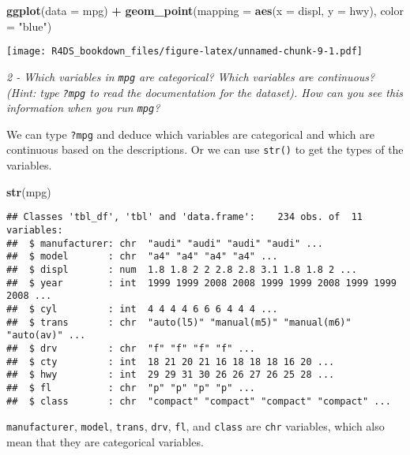 \documentclass[]{article}
\newenvironment{Shaded}{\begin{snugshade}}{\end{snugshade}}
\newcommand{\KeywordTok}[1]{\textcolor[rgb]{0.13,0.29,0.53}{\textbf{#1}}}
\newcommand{\DataTypeTok}[1]{\textcolor[rgb]{0.13,0.29,0.53}{#1}}
\newcommand{\StringTok}[1]{\textcolor[rgb]{0.31,0.60,0.02}{#1}}
\newcommand{\OperatorTok}[1]{\textcolor[rgb]{0.81,0.36,0.00}{\textbf{#1}}}
\newcommand{\NormalTok}[1]{#1}
\theoremstyle{definition}
\theoremstyle{definition}
\theoremstyle{definition}
\theoremstyle{remark}
\begin{document}
\begin{Shaded}
\begin{Highlighting}[]
\KeywordTok{ggplot}\NormalTok{(}\DataTypeTok{data =}\NormalTok{ mpg) }\OperatorTok{+}\StringTok{ }
\StringTok{  }\KeywordTok{geom_point}\NormalTok{(}\DataTypeTok{mapping =} \KeywordTok{aes}\NormalTok{(}\DataTypeTok{x =}\NormalTok{ displ, }\DataTypeTok{y =}\NormalTok{ hwy), }\DataTypeTok{color =} \StringTok{"blue"}\NormalTok{)}
\end{Highlighting}
\end{Shaded}

\texttt{[image: R4DS\_bookdown\_files/figure-latex/unnamed-chunk-9-1.pdf]}

\emph{2 - Which variables in \texttt{mpg} are categorical? Which
variables are continuous? (Hint: type \texttt{?mpg} to read the
documentation for the dataset). How can you see this information when
you run \texttt{mpg}?}

We can type \texttt{?mpg} and deduce which variables are categorical and
which are continuous based on the descriptions. Or we can use
\texttt{str()} to get the types of the variables.

\begin{Shaded}
\begin{Highlighting}[]
\KeywordTok{str}\NormalTok{(mpg)}
\end{Highlighting}
\end{Shaded}

\begin{verbatim}
## Classes 'tbl_df', 'tbl' and 'data.frame':    234 obs. of  11 variables:
##  $ manufacturer: chr  "audi" "audi" "audi" "audi" ...
##  $ model       : chr  "a4" "a4" "a4" "a4" ...
##  $ displ       : num  1.8 1.8 2 2 2.8 2.8 3.1 1.8 1.8 2 ...
##  $ year        : int  1999 1999 2008 2008 1999 1999 2008 1999 1999 2008 ...
##  $ cyl         : int  4 4 4 4 6 6 6 4 4 4 ...
##  $ trans       : chr  "auto(l5)" "manual(m5)" "manual(m6)" "auto(av)" ...
##  $ drv         : chr  "f" "f" "f" "f" ...
##  $ cty         : int  18 21 20 21 16 18 18 18 16 20 ...
##  $ hwy         : int  29 29 31 30 26 26 27 26 25 28 ...
##  $ fl          : chr  "p" "p" "p" "p" ...
##  $ class       : chr  "compact" "compact" "compact" "compact" ...
\end{verbatim}

\texttt{manufacturer}, \texttt{model}, \texttt{trans}, \texttt{drv},
\texttt{fl}, and \texttt{class} are \texttt{chr} variables, which also
mean that they are categorical variables.
\end{document}
